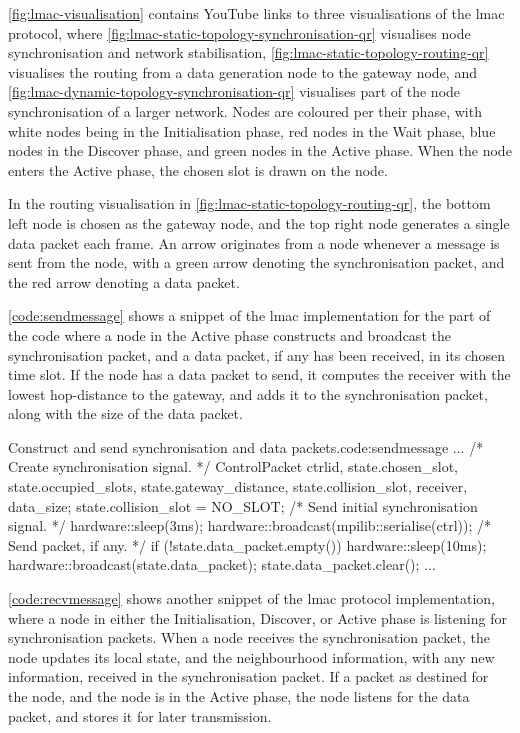 \autoref{fig:lmac-visualisation} contains YouTube links to three visualisations of the \gls{lmac} protocol,
where \autoref{fig:lmac-static-topology-synchronisation-qr} visualises node synchronisation and network
stabilisation, \autoref{fig:lmac-static-topology-routing-qr} visualises the routing from a data generation
node to the gateway node, and \autoref{fig:lmac-dynamic-topology-synchronisation-qr} visualises part of the
node synchronisation of a larger network. Nodes are coloured per their phase, with white nodes being in the
Initialisation phase, red nodes in the Wait phase, blue nodes in the Discover phase, and green nodes in the
Active phase. When the node enters the Active phase, the chosen slot is drawn on the node. \medbreak

In the routing visualisation in \autoref{fig:lmac-static-topology-routing-qr}, the bottom left node is chosen
as the gateway node, and the top right node generates a single data packet each frame. An arrow originates
from a node whenever a message is sent from the node, with a green arrow denoting the synchronisation packet,
and the red arrow denoting a data packet. \medbreak


\autoref{code:sendmessage} shows a snippet of the \gls{lmac} implementation for the part of the code where a
node in the Active phase constructs and broadcast the synchronisation packet, and a data packet, if any has
been received, in its chosen time slot. If the node has a data packet to send, it computes the receiver with
the lowest hop-distance to the gateway, and adds it to the synchronisation packet, along with the size of the 
data packet.

\begin{cpp}{Construct and send synchronisation and data packets.}{code:sendmessage}
...
/* Create synchronisation signal. */
ControlPacket ctrl{id, state.chosen_slot,
                   state.occupied_slots, state.gateway_distance,
                   state.collision_slot, receiver, data_size};
state.collision_slot = NO_SLOT;
/* Send initial synchronisation signal. */
hardware::sleep(3ms);
hardware::broadcast(mpilib::serialise(ctrl));
/* Send packet, if any. */
if (!state.data_packet.empty()) {
    hardware::sleep(10ms);
    hardware::broadcast(state.data_packet);
    state.data_packet.clear();
}
...
\end{cpp}

\autoref{code:recvmessage} shows another snippet of the \gls{lmac} protocol implementation, where a node in
either the Initialisation, Discover, or Active phase is listening for synchronisation packets. When a node
receives the synchronisation packet, the node updates its local state, and the neighbourhood information, with
any new information, received in the synchronisation packet. If a packet as destined for the node, and the node
is in the Active phase, the node listens for the data packet, and stores it for later transmission.
\smallbreak

